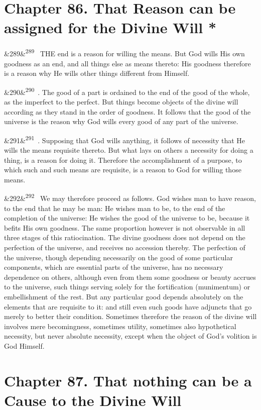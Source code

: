 \documentclass[12pt]{article}
\newcommand{\para}[1][]{\par\noindent\ifx&#1&\else\textsuperscript{\footnotesize #1}~\fi}
\begin{document}
\section*{Chapter 86. That Reason can be assigned for the Divine Will *}

\para[289] THE end is a reason for willing the means. But God wills His own goodness as an end, and all things else as means thereto: His goodness therefore is a reason why He wills other things different from Himself.

\para[290] 2. The good of a part is ordained to the end of the good of the whole, as the imperfect to the perfect. But things become objects of the divine will according as they stand in the order of goodness. It follows that the good of the universe is the reason why God wills every good of any part of the universe.

\para[291] 3. Supposing that God wills anything, it follows of necessity that He wills the means requisite thereto. But what lays on others a necessity for doing a thing, is a reason for doing it. Therefore the accomplishment of a purpose, to which such and such means are requisite, is a reason to God for willing those means.

\para[292] We may therefore proceed as follows. God wishes man to have reason, to the end that he may be man: He wishes man to be, to the end of the completion of the universe: He wishes the good of the universe to be, because it befits His own goodness. The same proportion however is not observable in all three stages of this ratiocination. The divine goodness does not depend on the perfection of the universe, and receives no accession thereby. The perfection of the universe, though depending necessarily on the good of some particular components, which are essential parts of the universe, has no necessary dependence on others, although even from them some goodness or beauty accrues to the universe, such things serving solely for the fortification (munimentum) or embellishment of the rest. But any particular good depends absolutely on the elements that are requisite to it: and still even such goods have adjuncts that go merely to better their condition. Sometimes therefore the reason of the divine will involves mere becomingness, sometimes utility, sometimes also hypothetical necessity, but never absolute necessity, except when the object of God's volition is God Himself.

\section*{Chapter 87. That nothing can be a Cause to the Divine Will}
\end{document}
